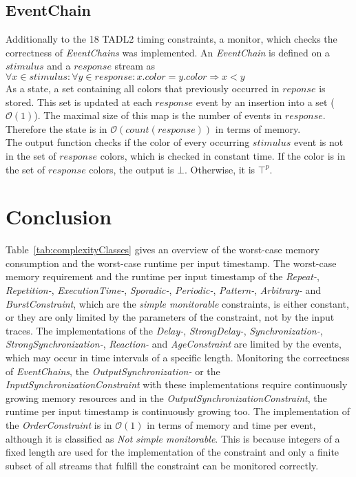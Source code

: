 \subsection{EventChain}
	Additionally to the 18 TADL2 timing constraints, a monitor, which checks the correctness of \textit{EventChains} was implemented. An \textit{EventChain} is defined on a $stimulus$ and a $response$ stream as\\[10pt]
	$\forall x \in stimulus:\forall y\in response: x.color=y.color\Rightarrow x<y$\\[10pt]
	As a state, a set containing all colors that previously occurred in $reponse$ is stored. This set is updated at each $response$  event by an insertion into a set ($\mathcal{O}(1)$). The maximal size of this map is the number of events in $response$. Therefore the state is in $\mathcal{O}(count(response))$ in terms of memory.\\
	The output function checks if the color of every occurring $stimulus$ event is not in the set of $response$ colors, which is checked in constant time. If the color is in the set of $response$ colors, the output is $\bot$. Otherwise, it is $\top^p$.
	
\section{Conclusion}
Table~\ref{tab:complexityClasses} gives an overview of the worst-case memory consumption and the worst-case runtime per input timestamp. The worst-case memory requirement and the runtime per input timestamp of the \textit{Repeat-}, \textit{Repetition-}, \textit{ExecutionTime-}, \textit{Sporadic-}, \textit{Periodic-}, \textit{Pattern-}, \textit{Arbitrary-} and \textit{BurstConstraint}, which are the \textit{simple monitorable} constraints, is either constant, or they are only limited by the parameters of the constraint, not by the input traces. The implementations of the \textit{Delay-}, \textit{StrongDelay-}, \textit{Synchronization-}, \textit{StrongSynchronization-}, \textit{Reaction-} and \textit{AgeConstraint} are limited by the events, which may occur in time intervals of a specific length. Monitoring the correctness of \textit{EventChains}, the \textit{OutputSynchronization-} or the \textit{InputSynchronizationConstraint} with these implementations require continuously growing memory resources and in the \textit{OutputSynchronizationConstraint}, the runtime per input timestamp is continuously growing too. The implementation of the \textit{OrderConstraint} is in $\mathcal{O}(1)$ in terms of memory and time per event, although it is classified as \textit{Not simple monitorable}. This is because integers of a fixed length are used for the implementation of the constraint and only a finite subset of all streams that fulfill the constraint can be monitored correctly.

